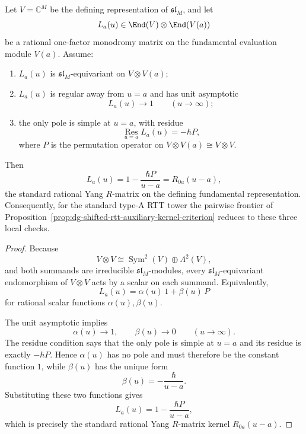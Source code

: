 \begin{proposition}
\label{prop:dg-shifted-rtt-typea-auxiliary-uniqueness}
Let $V=\mathbb{C}^M$ be the defining representation of
$\mathfrak{sl}_M$, and let
\[
L_a(u)\in \End(V)\otimes\End(V(a))
\]
be a rational one-factor monodromy matrix on the fundamental
evaluation module $V(a)$.  Assume:
\begin{enumerate}[label=\textup{(\roman*)}]
\item $L_a(u)$ is $\mathfrak{sl}_M$-equivariant on
  $V\otimes V(a)$;
\item $L_a(u)$ is regular away from $u=a$ and has unit asymptotic
  \[
  L_a(u)\to 1
  \qquad (u\to\infty);
  \]
\item the only pole is simple at $u=a$, with residue
  \[
  \operatorname*{Res}_{u=a}L_a(u)=-\hbar P,
  \]
  where $P$ is the permutation operator on
  $V\otimes V(a)\cong V\otimes V$.
\end{enumerate}
Then
\[
L_a(u)=1-\frac{\hbar P}{u-a}=R_{0a}(u-a),
\]
the standard rational Yang $R$-matrix on the defining fundamental
representation.  Consequently, for the standard type-A RTT tower the
pairwise frontier of
Proposition~\ref{prop:dg-shifted-rtt-auxiliary-kernel-criterion}
reduces to these three local checks.
\end{proposition}

\begin{proof}
Because
\[
V\otimes V \cong \operatorname{Sym}^2(V)\oplus \Lambda^2(V),
\]
and both summands are irreducible $\mathfrak{sl}_M$-modules, every
$\mathfrak{sl}_M$-equivariant endomorphism of $V\otimes V$ acts by a
scalar on each summand.  Equivalently,
\[
L_a(u)=\alpha(u)\,1+\beta(u)\,P
\]
for rational scalar functions $\alpha(u),\beta(u)$.

The unit asymptotic implies
\[
\alpha(u)\to 1,\qquad \beta(u)\to 0
\qquad (u\to\infty).
\]
The residue condition says that the only pole is simple at $u=a$ and
its residue is exactly $-\hbar P$.  Hence $\alpha(u)$ has no pole and
must therefore be the constant function $1$, while $\beta(u)$ has the
unique form
\[
\beta(u)=-\frac{\hbar}{u-a}.
\]
Substituting these two functions gives
\[
L_a(u)=1-\frac{\hbar P}{u-a},
\]
which is precisely the standard rational Yang $R$-matrix kernel
$R_{0a}(u-a)$.
\end{proof}

